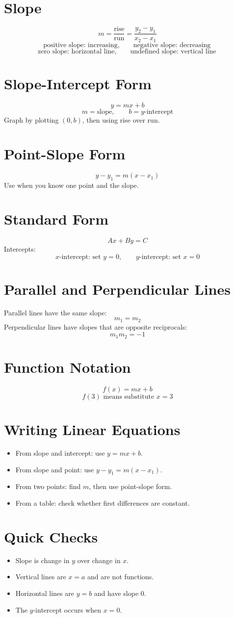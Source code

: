 \documentclass[11pt]{article}
\begin{document}

\section*{Slope}
\[
m=\frac{\text{rise}}{\text{run}}=\frac{y_2-y_1}{x_2-x_1}
\]
\[
\text{positive slope: increasing},\qquad
\text{negative slope: decreasing}
\]
\[
\text{zero slope: horizontal line},\qquad
\text{undefined slope: vertical line}
\]

\section*{Slope-Intercept Form}
\[
y=mx+b
\]
\[
m=\text{slope},\qquad b=\text{\(y\)-intercept}
\]
Graph by plotting $(0,b)$, then using rise over run.

\section*{Point-Slope Form}
\[
y-y_1=m(x-x_1)
\]
Use when you know one point and the slope.

\section*{Standard Form}
\[
Ax+By=C
\]
Intercepts:
\[
x\text{-intercept: set }y=0,\qquad
y\text{-intercept: set }x=0
\]

\section*{Parallel and Perpendicular Lines}
Parallel lines have the same slope:
\[
m_1=m_2
\]
Perpendicular lines have slopes that are opposite reciprocals:
\[
m_1m_2=-1
\]

\section*{Function Notation}
\[
f(x)=mx+b
\]
\[
f(3)\text{ means substitute }x=3
\]

\section*{Writing Linear Equations}
\begin{itemize}
  \item From slope and intercept: use $y=mx+b$.
  \item From slope and point: use $y-y_1=m(x-x_1)$.
  \item From two points: find $m$, then use point-slope form.
  \item From a table: check whether first differences are constant.
\end{itemize}

\section*{Quick Checks}
\begin{itemize}
  \item Slope is change in $y$ over change in $x$.
  \item Vertical lines are $x=a$ and are not functions.
  \item Horizontal lines are $y=b$ and have slope $0$.
  \item The \(y\)-intercept occurs when $x=0$.
\end{itemize}
\end{document}
